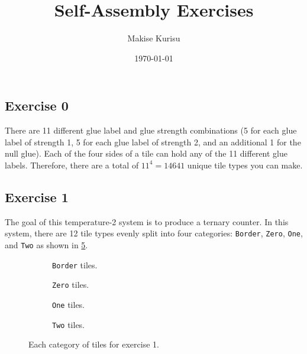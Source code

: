 \documentclass[11pt]{article}
\makeatletter
\renewcommand{\maketitle}{
    {\Large \bf \@title}
    \vspace{0.75em}

    {\normalsize \@author}
    \vspace{0.25em}

    {\normalsize \@date}
    \vspace{1em}
}
\makeatother
\begin{document}
\title{Self-Assembly Exercises}
\date{\today}
\author{Makise Kurisu}
\maketitle

\subsection*{Exercise 0}
There are 11 different glue label and glue strength combinations (5 for each glue label of
strength 1, 5 for each glue label of strength 2, and an additional 1 for the null glue). Each of the
four sides of a tile can hold any of the 11 different glue labels. Therefore, there are a total of
$11^4 = 14641$ unique tile types you can make.

\subsection*{Exercise 1}
The goal of this temperature-2 system is to produce a ternary counter. In this system, there are 12
tile types evenly split into four categories: \verb|Border|, \verb|Zero|, \verb|One|, and \verb|Two|
as shown in \cref{fig:exs-1}.

\begin{figure}[htbp]
    \centering
    \begin{subfigure}{.5\textwidth}
        \centering
        
        
        
        \caption{\texttt{Border} tiles.}
        \label{fig:exs-1_border}
    \end{subfigure}%
    \begin{subfigure}{.5\textwidth}
        \centering
        
        
        
        \caption{\texttt{Zero} tiles.}
        \label{fig:exs-1_zero}
    \end{subfigure}
    \begin{subfigure}{.5\textwidth}
        \centering
        
        
        
        \caption{\texttt{One} tiles.}
        \label{fig:exs-1_one}
    \end{subfigure}%
    \begin{subfigure}{.5\textwidth}
        \centering
        
        
        
        \caption{\texttt{Two} tiles.}
        \label{fig:exs-1_two}
    \end{subfigure}
    \caption{Each category of tiles for exercise 1.}
    \label{fig:exs-1}
\end{figure}
\end{document}
